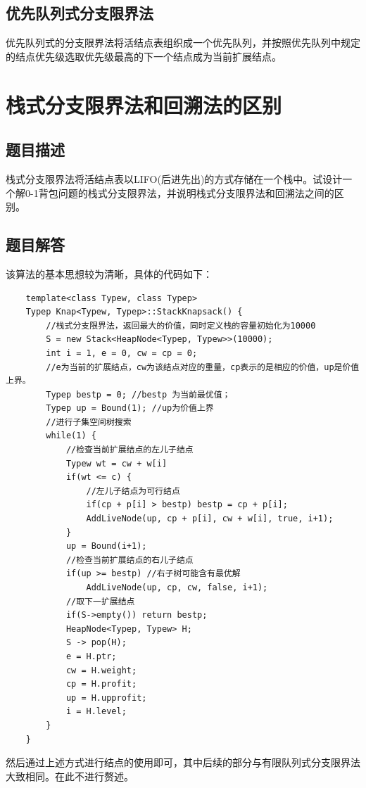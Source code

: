 \documentclass[UTF8]{ctexart}
\begin{document}
    \subsection{优先队列式分支限界法}
    优先队列式的分支限界法将活结点表组织成一个优先队列，并按照优先队列中规定的结点优先级选取优先级最高的下一个结点成为当前扩展结点。

    \section{栈式分支限界法和回溯法的区别}
    \subsection{题目描述}
    栈式分支限界法将活结点表以LIFO(后进先出)的方式存储在一个栈中。试设计一个解0-1背包问题的栈式分支限界法，并说明栈式分支限界法和回溯法之间的区别。
    \subsection{题目解答}
    该算法的基本思想较为清晰，具体的代码如下：

    \begin{small}
    \begin{lstlisting}
    template<class Typew, class Typep>
    Typep Knap<Typew, Typep>::StackKnapsack() {
        //栈式分支限界法，返回最大的价值，同时定义栈的容量初始化为10000
        S = new Stack<HeapNode<Typep, Typew>>(10000);
        int i = 1, e = 0, cw = cp = 0;
        //e为当前的扩展结点，cw为该结点对应的重量，cp表示的是相应的价值，up是价值上界。
        Typep bestp = 0; //bestp 为当前最优值；
        Typep up = Bound(1); //up为价值上界
        //进行子集空间树搜索
        while(1) {
            //检查当前扩展结点的左儿子结点
            Typew wt = cw + w[i]
            if(wt <= c) {
                //左儿子结点为可行结点
                if(cp + p[i] > bestp) bestp = cp + p[i];
                AddLiveNode(up, cp + p[i], cw + w[i], true, i+1);
            }
            up = Bound(i+1);
            //检查当前扩展结点的右儿子结点
            if(up >= bestp) //右子树可能含有最优解
                AddLiveNode(up, cp, cw, false, i+1);
            //取下一扩展结点
            if(S->empty()) return bestp;
            HeapNode<Typep, Typew> H;
            S -> pop(H);
            e = H.ptr;
            cw = H.weight;
            cp = H.profit;
            up = H.upprofit;
            i = H.level;
        }
    }
    \end{lstlisting}
    \end{small}
    然后通过上述方式进行结点的使用即可，其中后续的部分与有限队列式分支限界法大致相同。在此不进行赘述。
\end{document}

